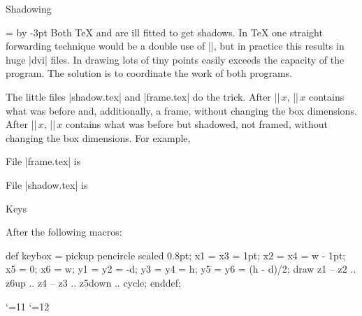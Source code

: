 


\def\beginshadowpar{\setbox0=\vbox\bgroup \kern0.1pt
 \advance\parindent by -3pt \leftskip=3pt\rightskip=3pt }
\def\endshadowpar{\par\kern3pt\egroup\framebox0\shadowbox0\box0 }

\beginsection Shadowing

\beginshadowpar\noindent
Both {\TeX} and {\MF} are ill fitted to get shadows.  In {\TeX} one
straight forwarding technique would be a double use of |\leaders|, but in
practice this results in huge |dvi| files.  In {\MF} drawing lots of tiny
points easily exceeds the capacity of the program.  The solution is to
coordinate the work of both programs.
\endshadowpar

The little files |shadow.tex| and |frame.tex| do the trick.  After
|\framebox|$\,x$, |\box|$\,x$ contains what was before and,
additionally, a frame, without changing the box dimensions.  After
|\shadowbox|$\,x$, |\box|$\,x$ contains what was before but
shadowed, not framed, without changing the box dimensions.  For
example,


File |frame.tex| is

\beginlisting
{}
\endlisting

File |shadow.tex| is

\beginlisting
{}
\endlisting


\beginsection Keys

After the following {\MTeX} macros:


\MTcode
def keybox =
 pickup pencircle scaled 0.8pt;
 x1 = x3 = 1pt; x2 = x4 = w - 1pt; x5 = 0; x6 = w;
 y1 = y2 = -d; y3 = y4 = h; y5 = y6 = (h - d)/2;
 draw z1 -- z2 .. z6{up} .. z4 -- z3 .. z5{down} .. cycle;
enddef;

\catcode`\@=11
\def\defkey#1#2{\setbox0=\hbox{\sf#2}\count@=\MTn@
 \dimen0=\wd0\advance\dimen0 by 2pt
 \dimen2=\ht0\advance\dimen2 by 1pt
 \dimen4=\dp0\advance\dimen4 by 1pt
 \MTbeginchar(\the\dimen0,\the\dimen2,\the\dimen4);%
  \MTline{ keybox;}%
 \MTendchar;%
 \edef#1{\ifMTmf 
  \rlap{\kern1pt\sf#2}{\MTfont\char\the\count@}%
 \else           
  \ifcase\pdfoutput \special{psfile=auxiliar.\number\count@}%
  \else \ifMTf@le\noexpand\MPtoPDF{auxiliar.\number\count@}\fi
  \fi 
  \kern1pt{\sf#2}\kern1pt
 \fi}}
\catcode`\@=12

